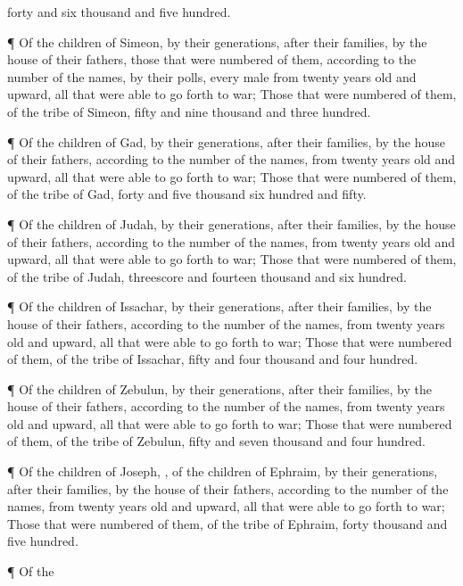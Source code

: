 {forty and
six
thousand and
five
hundred.
\par }{\PP {}¶ Of the
children of
Simeon, by their
generations, after their
families, by the
house of their
fathers, those that were
numbered of them, according to the
number of the
names, by their
polls, every
male from
twenty
years
old and
upward, all that were able to go
forth to
war;
Those that were
numbered of them,
{} of the
tribe of
Simeon,
{}
fifty and
nine
thousand and
three
hundred.
\par }{\PP {}¶ Of the
children of
Gad, by their
generations, after their
families, by the
house of their
fathers, according to the
number of the
names, from
twenty
years
old and
upward, all that were able to go
forth to
war;
Those that were
numbered of them,
{} of the
tribe of
Gad,
{}
forty and
five
thousand
six
hundred and
fifty.
\par }{\PP {}¶ Of the
children of
Judah, by their
generations, after their
families, by the
house of their
fathers, according to the
number of the
names, from
twenty
years
old and
upward, all that were able to go
forth to
war;
Those that were
numbered of them,
{} of the
tribe of
Judah,
{} threescore and
fourteen
thousand and
six
hundred.
\par }{\PP {}¶ Of the
children of
Issachar, by their
generations, after their
families, by the
house of their
fathers, according to the
number of the
names, from
twenty
years
old and
upward, all that were able to go
forth to
war;
Those that were
numbered of them,
{} of the
tribe of
Issachar,
{}
fifty and
four
thousand and
four
hundred.
\par }{\PP {}¶ Of the
children of
Zebulun, by their
generations, after their
families, by the
house of their
fathers, according to the
number of the
names, from
twenty
years
old and
upward, all that were able to go
forth to
war;
Those that were
numbered of them,
{} of the
tribe of
Zebulun,
{}
fifty and
seven
thousand and
four
hundred.
\par }{\PP {}¶ Of the
children of
Joseph,
{}, of the
children of
Ephraim, by their
generations, after their
families, by the
house of their
fathers, according to the
number of the
names, from
twenty
years
old and
upward, all that were able to go
forth to
war;
Those that were
numbered of them,
{} of the
tribe of
Ephraim,
{}
forty
thousand and
five
hundred.
\par }{\PP {}¶ Of the
}
